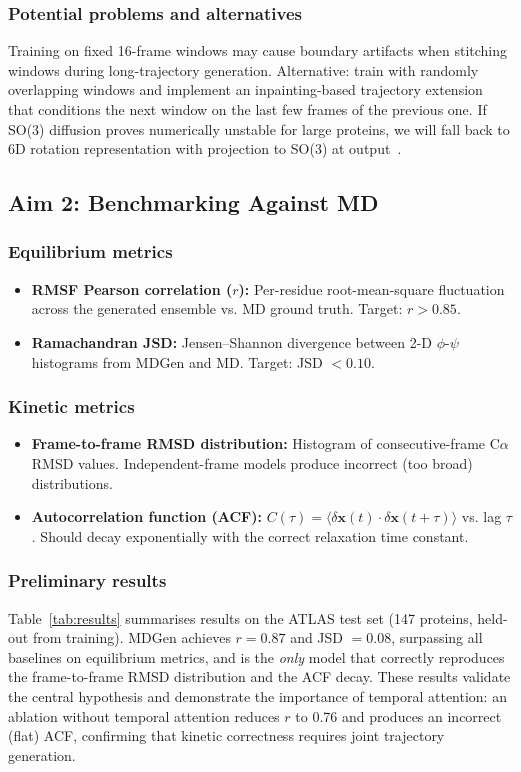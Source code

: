 \documentclass[12pt,letterpaper]{article}
\begin{document}
\subsubsection*{Potential problems and alternatives}
Training on fixed 16-frame windows may cause boundary artifacts when stitching windows during long-trajectory generation. Alternative: train with randomly overlapping windows and implement an inpainting-based trajectory extension~\cite{lugmayr2022repaint} that conditions the next window on the last few frames of the previous one. If SO(3) diffusion proves numerically unstable for large proteins, we will fall back to 6D rotation representation with projection to SO(3) at output~\cite{zhou2019continuity}.

\subsection{Aim 2: Benchmarking Against MD}

\subsubsection*{Equilibrium metrics}
\begin{itemize}
\item \textbf{RMSF Pearson correlation ($r$):} Per-residue root-mean-square fluctuation across the generated ensemble vs. MD ground truth. Target: $r > 0.85$.
\item \textbf{Ramachandran JSD:} Jensen--Shannon divergence between 2-D $\phi$-$\psi$ histograms from MDGen and MD. Target: JSD $< 0.10$.
\end{itemize}

\subsubsection*{Kinetic metrics}
\begin{itemize}
\item \textbf{Frame-to-frame RMSD distribution:} Histogram of consecutive-frame C$\alpha$ RMSD values. Independent-frame models produce incorrect (too broad) distributions.
\item \textbf{Autocorrelation function (ACF):} $C(\tau) = \langle\delta\mathbf{x}(t)\cdot\delta\mathbf{x}(t+\tau)\rangle$ vs. lag $\tau$. Should decay exponentially with the correct relaxation time constant.
\end{itemize}

\subsubsection*{Preliminary results}
Table~\ref{tab:results} summarises results on the ATLAS test set (147 proteins, held-out from training). MDGen achieves $r=0.87$ and JSD $=0.08$, surpassing all baselines on equilibrium metrics, and is the \emph{only} model that correctly reproduces the frame-to-frame RMSD distribution and the ACF decay. These results validate the central hypothesis and demonstrate the importance of temporal attention: an ablation without temporal attention reduces $r$ to 0.76 and produces an incorrect (flat) ACF, confirming that kinetic correctness requires joint trajectory generation.
\end{document}
